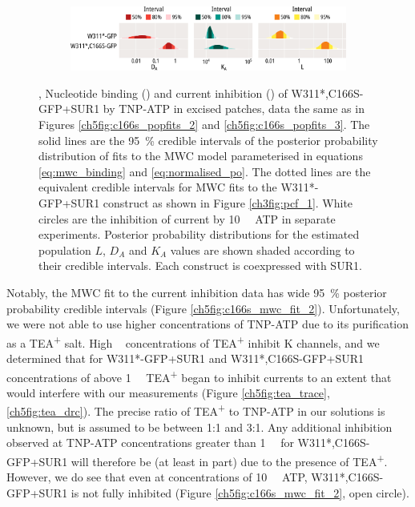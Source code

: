\begin{figure}[hbtp]
\begin{subfigure}[t]{0.9\textwidth}
		\includegraphics[width=\textwidth]{mwc_c166s_2.pdf}
	\end{subfigure}
	\caption[C166S alters transduction of nucleotide binding to Kir6.2]{
	,  Nucleotide binding () and current inhibition () of W311*,C166S-GFP+SUR1 by TNP-ATP in excised patches, data the same as in Figures \ref{ch5fig:c166s_popfits_2} and \ref{ch5fig:c166s_popfits_3}.
	The solid lines are the \SI{95}{\percent} credible intervals of the posterior probability distribution of fits to the MWC model parameterised in equations \ref{eq:mwc_binding} and \ref{eq:normalised_po}.
	The dotted lines are the equivalent credible intervals for MWC fits to the W311*-GFP+SUR1 construct as shown in Figure \ref{ch3fig:pcf_1}.
	White circles are the inhibition of current by \SI{10}{\milli\Molar} ATP in separate experiments.
	 Posterior probability distributions for the estimated population $L$, $D_A$ and $K_A$ values are shown shaded according to their credible intervals.
	Each construct is coexpressed with SUR1.
	}\label{ch5fig:c166s_3}
\end{figure}

Notably, the MWC fit to the current inhibition data has wide \SI{95}{\percent} posterior probability credible intervals (Figure \ref{ch5fig:c166s_mwc_fit_2}).
Unfortunately, we were not able to use higher concentrations of TNP-ATP due to its purification as a TEA\textsuperscript{+} salt.
High \si{\milli\Molar} concentrations of TEA\textsuperscript{+} inhibit K\ATP{} channels, and we determined that for W311*-GFP+SUR1 and W311*,C166S-GFP+SUR1 concentrations of above \SI{1}{\milli\Molar} TEA\textsuperscript{+} began to inhibit currents to an extent that would interfere with our measurements (Figure \ref{ch5fig:tea_trace}, \ref{ch5fig:tea_drc}).
The precise ratio of TEA\textsuperscript{+} to TNP-ATP in our solutions is unknown, but is assumed to be between 1:1 and 3:1.
Any additional inhibition observed at TNP-ATP concentrations greater than \SI{1}{\milli\Molar} for W311*,C166S-GFP+SUR1 will therefore be (at least in part) due to the presence of TEA\textsuperscript{+}.
However, we do see that even at concentrations of \SI{10}{\milli\Molar} ATP, W311*,C166S-GFP+SUR1 is not fully inhibited (Figure \ref{ch5fig:c166s_mwc_fit_2}, open circle).

